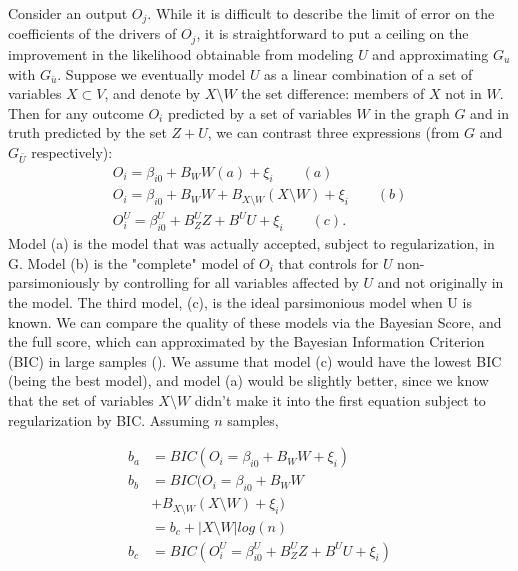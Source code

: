 \documentclass[letterpaper]{article}
\begin{document}
Consider an output $O_j$.  While it is difficult to describe the limit of error on the coefficients of the drivers of $O_j$, it is straightforward to put a ceiling on the improvement in the likelihood obtainable from modeling $U$ and approximating $G_u$ with $G_{\bar{u}}$.  Suppose we eventually model $U$ as a linear combination of a set of variables $X \subset V$, and denote by $X \setminus W$ the set difference: members of $X$ not in $W$.  Then for any outcome $O_i$ predicted by a set of variables $W$ in the graph $G$ and in truth predicted by the set $Z + U$, we can contrast three expressions (from $G$ and $G_{\bar{U}}$ respectively):
\begin{equation}
\begin{split}
O_i = \beta_{i0} + B_W W (a) + \xi_i \qquad (a)\\
O_i = \beta_{i0} + B_W W + B_{X \setminus W} (X \setminus W)
 + \xi_i \qquad (b)\\
O_i^U = \beta_{i0}^U + B_Z^U Z + B^U U + \xi_i \qquad (c).
\end{split}
\end{equation}
Model (a) is the model that was actually accepted, subject to regularization, in G.  Model (b) is the "complete" model of $O_i$ that controls for $U$ non-parsimoniously by controlling for all variables affected by $U$ and not originally in the model.  The third model, (c), is the ideal parsimonious model when U is known.  We can compare the quality of these models via the Bayesian Score, and the full score, which can approximated by the Bayesian Information Criterion (BIC) in large samples (\cite{koller_probabilistic_2009}).  We assume that model (c) would have the lowest BIC (being the best model), and model (a) would be slightly better, since we know that the set of variables $X \setminus W$ didn't make it into the first equation subject to regularization by BIC.  Assuming $n$ samples,

\begin{align}
b_{a} &= BIC(O_{i} = \beta_{i0} + B_W W + \xi_i)  \\
b_{b} &= BIC(O_i = \beta_{i0} + B_W W  \\
               &  + B_{X \setminus W} (X \setminus W) + \xi_i) \nonumber \\
&  = b_c + |X\setminus W| log(n) \nonumber \\
b_{c} &= BIC(O_i^U = \beta_{i0}^U + B_Z^U Z + B^U U + \xi_i)
\end{align}
\end{document}
